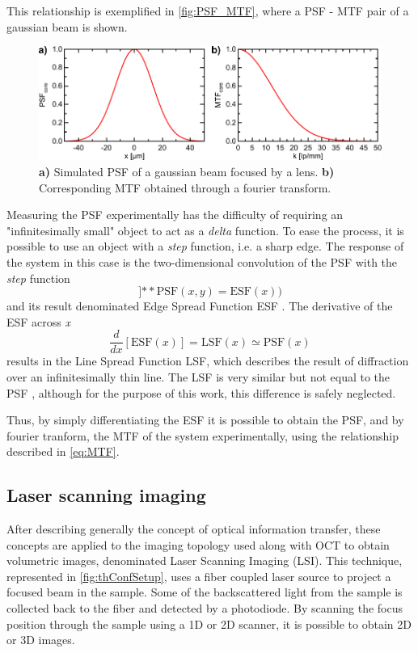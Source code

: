 This relationship is exemplified in \autoref{fig:PSF_MTF}, where a PSF - MTF pair of a gaussian beam is shown.

\begin{figure}[h!]\centering \includegraphics{figures/20_Theory/Optical/imaging/PSF_MTF.pdf}
      \caption{	\textbf{a)} Simulated PSF of a gaussian beam focused by a lens.
				\textbf{b)} Corresponding MTF obtained through a fourier transform. 
				}
      \label{fig:PSF_MTF}
\end{figure}

Measuring the PSF experimentally has the difficulty of requiring an "infinitesimally small" object to act as a \textit{delta} function. To ease the process, it is possible to use an object with a \textit{step} function, i.e. a sharp edge. The response of the system in this case is the two-dimensional convolution of the PSF with the \textit{step} function 
\begin{equation}
[\mathrm{Step}(x)1(y)]]\mathrm{ \ast\ast } \mathrm{PSF}(x,y) = \mathrm{ESF}(x))
\end{equation}
and its result denominated Edge Spread Function ESF \cite{Boreman2001}. The derivative of the ESF across \textit{x} 
\begin{equation}
\frac{d}{dx}[\textrm{ESF}(x)] = \textrm{LSF}(x) \simeq \textrm{PSF}(x)
\end{equation}
results in the Line Spread Function LSF, which describes the result of diffraction over an infinitesimally thin line. The LSF is very similar but not equal to the PSF \cite{Boreman2001}, although for the purpose of this work, this difference is safely neglected.

Thus, by simply differentiating the ESF it is possible to obtain the PSF, and by fourier tranform, the MTF of the system experimentally, using the relationship described in \ref{eq:MTF}. 

\subsection{Laser scanning imaging}
\label{ssec:LSI}
After describing generally the concept of optical information transfer, these concepts are applied to the imaging topology used along with OCT to obtain volumetric images, denominated Laser Scanning Imaging (LSI). This technique, represented in \autoref{fig:thConfSetup}, uses a fiber coupled laser source to project a focused beam in the sample. Some of the backscattered light from the sample is collected back to the fiber and detected by a photodiode. By scanning the focus position through the sample using a 1D or 2D scanner, it is possible to obtain 2D or 3D images.

